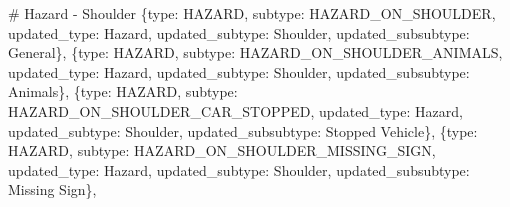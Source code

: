 \documentclass[
  letterpaper,
  DIV=11,
  numbers=noendperiod]{scrartcl}
\newenvironment{Shaded}{\begin{snugshade}}{\end{snugshade}}
\newcommand{\CommentTok}[1]{\textcolor[rgb]{0.37,0.37,0.37}{#1}}
\newcommand{\NormalTok}[1]{\textcolor[rgb]{0.00,0.23,0.31}{#1}}
\newcommand{\StringTok}[1]{\textcolor[rgb]{0.13,0.47,0.30}{#1}}
\begin{document}
\begin{Shaded}
\begin{Highlighting}[]
    \CommentTok{\# Hazard {-} Shoulder}
\NormalTok{    \{}\StringTok{\textquotesingle{}type\textquotesingle{}}\NormalTok{: }\StringTok{\textquotesingle{}HAZARD\textquotesingle{}}\NormalTok{, }\StringTok{\textquotesingle{}subtype\textquotesingle{}}\NormalTok{: }\StringTok{\textquotesingle{}HAZARD\_ON\_SHOULDER\textquotesingle{}}\NormalTok{, }
     \StringTok{\textquotesingle{}updated\_type\textquotesingle{}}\NormalTok{: }\StringTok{\textquotesingle{}Hazard\textquotesingle{}}\NormalTok{, }\StringTok{\textquotesingle{}updated\_subtype\textquotesingle{}}\NormalTok{: }\StringTok{\textquotesingle{}Shoulder\textquotesingle{}}\NormalTok{, }\StringTok{\textquotesingle{}updated\_subsubtype\textquotesingle{}}\NormalTok{: }\StringTok{\textquotesingle{}General\textquotesingle{}}\NormalTok{\},}
\NormalTok{    \{}\StringTok{\textquotesingle{}type\textquotesingle{}}\NormalTok{: }\StringTok{\textquotesingle{}HAZARD\textquotesingle{}}\NormalTok{, }\StringTok{\textquotesingle{}subtype\textquotesingle{}}\NormalTok{: }\StringTok{\textquotesingle{}HAZARD\_ON\_SHOULDER\_ANIMALS\textquotesingle{}}\NormalTok{, }
     \StringTok{\textquotesingle{}updated\_type\textquotesingle{}}\NormalTok{: }\StringTok{\textquotesingle{}Hazard\textquotesingle{}}\NormalTok{, }\StringTok{\textquotesingle{}updated\_subtype\textquotesingle{}}\NormalTok{: }\StringTok{\textquotesingle{}Shoulder\textquotesingle{}}\NormalTok{, }\StringTok{\textquotesingle{}updated\_subsubtype\textquotesingle{}}\NormalTok{: }\StringTok{\textquotesingle{}Animals\textquotesingle{}}\NormalTok{\},}
\NormalTok{    \{}\StringTok{\textquotesingle{}type\textquotesingle{}}\NormalTok{: }\StringTok{\textquotesingle{}HAZARD\textquotesingle{}}\NormalTok{, }\StringTok{\textquotesingle{}subtype\textquotesingle{}}\NormalTok{: }\StringTok{\textquotesingle{}HAZARD\_ON\_SHOULDER\_CAR\_STOPPED\textquotesingle{}}\NormalTok{, }
     \StringTok{\textquotesingle{}updated\_type\textquotesingle{}}\NormalTok{: }\StringTok{\textquotesingle{}Hazard\textquotesingle{}}\NormalTok{, }\StringTok{\textquotesingle{}updated\_subtype\textquotesingle{}}\NormalTok{: }\StringTok{\textquotesingle{}Shoulder\textquotesingle{}}\NormalTok{, }\StringTok{\textquotesingle{}updated\_subsubtype\textquotesingle{}}\NormalTok{: }\StringTok{\textquotesingle{}Stopped Vehicle\textquotesingle{}}\NormalTok{\},}
\NormalTok{    \{}\StringTok{\textquotesingle{}type\textquotesingle{}}\NormalTok{: }\StringTok{\textquotesingle{}HAZARD\textquotesingle{}}\NormalTok{, }\StringTok{\textquotesingle{}subtype\textquotesingle{}}\NormalTok{: }\StringTok{\textquotesingle{}HAZARD\_ON\_SHOULDER\_MISSING\_SIGN\textquotesingle{}}\NormalTok{, }
     \StringTok{\textquotesingle{}updated\_type\textquotesingle{}}\NormalTok{: }\StringTok{\textquotesingle{}Hazard\textquotesingle{}}\NormalTok{, }\StringTok{\textquotesingle{}updated\_subtype\textquotesingle{}}\NormalTok{: }\StringTok{\textquotesingle{}Shoulder\textquotesingle{}}\NormalTok{, }\StringTok{\textquotesingle{}updated\_subsubtype\textquotesingle{}}\NormalTok{: }\StringTok{\textquotesingle{}Missing Sign\textquotesingle{}}\NormalTok{\},}
    

\end{Highlighting}
\end{Shaded}
\end{document}
